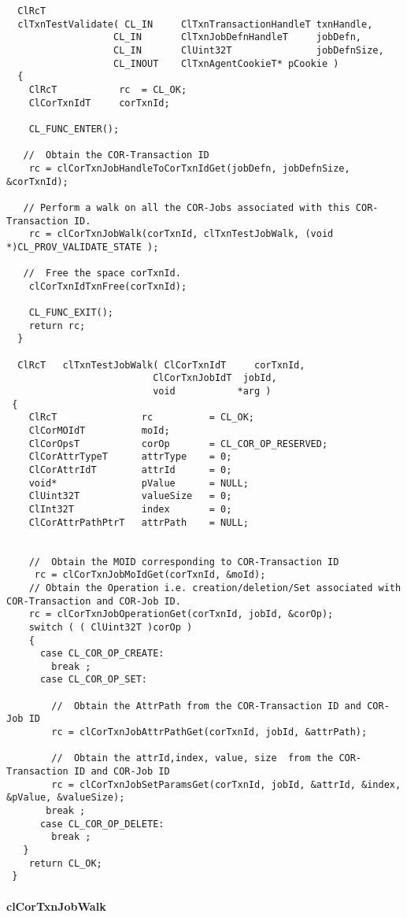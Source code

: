 \footnotesize\begin{verbatim}  ClRcT
  clTxnTestValidate( CL_IN     ClTxnTransactionHandleT txnHandle,
                   CL_IN       ClTxnJobDefnHandleT     jobDefn,
                   CL_IN       ClUint32T               jobDefnSize,
                   CL_INOUT    ClTxnAgentCookieT* pCookie )
  {
    ClRcT           rc  = CL_OK;
    ClCorTxnIdT     corTxnId;

    CL_FUNC_ENTER();

   //  Obtain the COR-Transaction ID 
    rc = clCorTxnJobHandleToCorTxnIdGet(jobDefn, jobDefnSize, &corTxnId);

   // Perform a walk on all the COR-Jobs associated with this COR-Transaction ID.
    rc = clCorTxnJobWalk(corTxnId, clTxnTestJobWalk, (void *)CL_PROV_VALIDATE_STATE );

   //  Free the space corTxnId.
    clCorTxnIdTxnFree(corTxnId);

    CL_FUNC_EXIT();
    return rc;
  }

  ClRcT   clTxnTestJobWalk( ClCorTxnIdT     corTxnId,
                          ClCorTxnJobIdT  jobId,
                          void           *arg )
 {
    ClRcT               rc          = CL_OK;
    ClCorMOIdT          moId;
    ClCorOpsT           corOp       = CL_COR_OP_RESERVED;
    ClCorAttrTypeT      attrType    = 0; 
    ClCorAttrIdT        attrId      = 0;    
    void*               pValue      = NULL;
    ClUint32T           valueSize   = 0;
    ClInt32T            index       = 0;
    ClCorAttrPathPtrT   attrPath    = NULL;


    //  Obtain the MOID corresponding to COR-Transaction ID
     rc = clCorTxnJobMoIdGet(corTxnId, &moId);
    // Obtain the Operation i.e. creation/deletion/Set associated with COR-Transaction and COR-Job ID.
    rc = clCorTxnJobOperationGet(corTxnId, jobId, &corOp);
    switch ( ( ClUint32T )corOp )
    {
      case CL_COR_OP_CREATE:
        break ;
      case CL_COR_OP_SET:

        //  Obtain the AttrPath from the COR-Transaction ID and COR-Job ID
        rc = clCorTxnJobAttrPathGet(corTxnId, jobId, &attrPath);

        //  Obtain the attrId,index, value, size  from the COR-Transaction ID and COR-Job ID
        rc = clCorTxnJobSetParamsGet(corTxnId, jobId, &attrId, &index, &pValue, &valueSize);
       break ;
      case CL_COR_OP_DELETE:
        break ;
   }
    return CL_OK;
 }
\end{verbatim}
\normalsize
 \hypertarget{pagecor501}{}\paragraph{cl\-Cor\-Txn\-Job\-Walk}\label{pagecor501}
